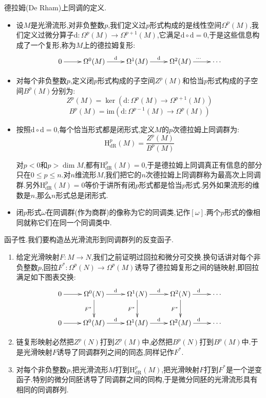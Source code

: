 德拉姆(De Rham)上同调的定义.
\begin{itemize}
	\item 设$M$是光滑流形,对非负整数$p$,我们定义过$p$形式构成的是线性空间$\Omega^p(M)$,我们定义过微分算子$\mathrm{d}:\Omega^p(M)\to\Omega^{p+1}(M)$,它满足$\mathrm{d}\circ\mathrm{d}=0$,于是这些信息构成了一个复形,称为$M$上的德拉姆复形:
	$$\xymatrix{0\ar[r]&\Omega^0(M)\ar[r]^{\mathrm{d}}&\Omega^1(M)\ar[r]^{\mathrm{d}}&\Omega^2(M)\ar[r]^{\cdots}&\cdots}$$
	\item 对每个非负整数$p$,定义闭$p$形式构成的子空间$Z^p(M)$和恰当$p$形式构成的子空间$B^p(M)$分别为:
	$$Z^p(M)=\ker\left(\mathrm{d}:\Omega^p(M)\to\Omega^{p+1}(M)\right)$$
	$$B^p(M)=\mathrm{im}\left(\mathrm{d}:\Omega^{p-1}(M)\to\Omega^p(M)\right)$$
	\item 按照$\mathrm{d}\circ\mathrm{d}=0$,每个恰当形式都是闭形式,定义$M$的$p$次德拉姆上同调群为:
	$$\mathrm{H}_{\mathrm{dR}}^p(M)=\frac{Z^p(M)}{B^p(M)}$$
	
	对$p<0$和$p>\dim M$,都有$\mathrm{H}^p_{\mathrm{dR}}(M)=0$,于是德拉姆上同调真正有信息的部分只在$0\le p\le n$.对$n$维流形$M$,我们把它的$n$次德拉姆上同调群称为最高次上同调群.另外$\mathrm{H}^p_{\mathrm{dR}}(M)=0$等价于讲所有闭$p$形式都是恰当$p$形式.另外如果流形的维数是$n$,那么$n$形式总是闭形式.
	\item 闭$p$形式$\omega$在同调群(作为商群)的像称为它的同调类,记作$[\omega]$.两个$p$形式的像相同就称它们在同一个同调类中.
\end{itemize}

函子性.我们要构造丛光滑流形到同调群列的反变函子.
\begin{enumerate}
	\item 给定光滑映射$F:M\to N$,我们之前证明过回拉和微分可交换.换句话讲对每个非负整数$p$,回拉$F^*:\Omega^p(N)\to\Omega^p(M)$诱导了德拉姆复形之间的链映射,即回拉满足如下图表交换:
	$$\xymatrix{0\ar[r]&\Omega^0(N)\ar[r]^{\mathrm{d}}\ar[d]_{F^*}&\Omega^1(N)\ar[r]^{\mathrm{d}}\ar[d]_{F^*}&\Omega^2(N)\ar[r]^{\mathrm{d}}\ar[d]_{F^*}&\cdots\\0\ar[r]&\Omega^0(M)\ar[r]^{\mathrm{d}}&\Omega^1(M)\ar[r]^{\mathrm{d}}&\Omega^2(M)\ar[r]^{\mathrm{d}}&\cdots}$$
	\item 链复形映射必然把$Z^p(N)$打到$Z^p(M)$中,必然把$B^p(N)$打到$B^p(M)$中.于是光滑映射$F$诱导了同调群列之间的同态,同样记作$F^*$.
	\item 对每个非负整数$p$,把光滑流形$M$打到$\mathrm{H}^p_{\mathrm{dR}}(M)$,把光滑映射$F$打到$F^*$是一个逆变函子.特别的微分同胚诱导了同调群之间的同构,于是微分同胚的光滑流形具有相同的同调群列.
\end{enumerate}

